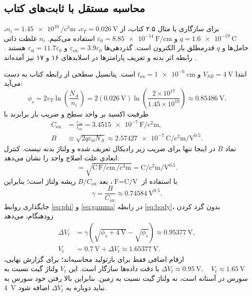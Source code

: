 \documentclass[12pt,a4paper]{article}
\newcommand{\exnum}[1]{\mbox{\beginL#1\endL}}
\begin{document}
\subsection*{محاسبه مستقل با ثابت‌های کتاب}
برای سازگاری با مثال \exnum{۲.۵} کتاب، از \(v_T=\qty{0.026}{\volt}\)، \(n_i=\qty{1.45e10}{\per\cubic\centi\metre}\)، \(q=\qty{1.6e-19}{\coulomb}\) و \(\varepsilon_0=\qty{8.85e-14}{\farad\per\centi\metre}\) استفاده می‌کنیم. \(n_i\) غلظت ذاتی حامل‌ها و \(q\) قدرمطلق بار الکترون است. گذردهی‌ها \(\varepsilon_{\mathrm{ox}}=3.9\varepsilon_0\) و \(\varepsilon_{\mathrm{si}}=11.7\varepsilon_0\) هستند \cite[صفحات چاپی ۶۵ و ۷۹ تا ۸۰]{weste}. رابطه اثر بدنه و تعریف پارامترها در اسلایدهای ۱۶ و ۱۷ نیز آمده‌اند \cite{nonideal}.

ابتدا \(V_{SB}=\qty{4}{\volt}\) و \(t_{\mathrm{ox}}=\qty{1e-6}{\centi\metre}\) است. پتانسیل سطحی از رابطه کتاب به دست می‌آید:
\begin{equation}
 \phi_s=2v_T\ln\!\left(\frac{N_A}{n_i}\right)
 =2(\qty{0.026}{\volt})\ln\!\left(\frac{2\times10^{17}}{1.45\times10^{10}}\right)
 \approx\qty{0.85486}{\volt}.
 \label{eq:phi}
\end{equation}
ظرفیت اکسید بر واحد سطح و ضریب بار برابرند با
\begin{align}
 C_{\mathrm{ox}}&=\frac{\varepsilon_{\mathrm{ox}}}{t_{\mathrm{ox}}}
 =\qty{3.4515e-7}{\farad\per\square\centi\metre},\label{eq:cox}\\
 B&\equiv\sqrt{2q\varepsilon_{\mathrm{si}}N_A}
 \approx\qty{2.57427e-7}{\coulomb\per\square\centi\metre\per\volt\tothe{0.5}}.
 \label{eq:body-coefficient}
\end{align}
نماد \(B\) در اینجا تنها برای ضریب زیر رادیکال تعریف شده و ولتاژ بدنه نیست. کنترل ابعادی علت اصلاح واحد را نشان می‌دهد:
\begin{equation}
 [B]=\sqrt{\unit{\coulomb}\,
                \unit{\farad\per\centi\metre}\,
                \unit{\per\cubic\centi\metre}}
 =\unit{\coulomb\per\square\centi\metre\per\volt\tothe{0.5}}.
 \label{eq:dimension}
\end{equation}
با استفاده از \(\unit{\farad}=\unit{\coulomb\per\volt}\)، بعد \(B/C_{\mathrm{ox}}\) ریشه ولتاژ است؛ بنابراین
\begin{equation}
 \gamma=\frac{B}{C_{\mathrm{ox}}}
 \approx\qty{0.74584}{\volt\tothe{0.5}}.
 \label{eq:gamma}
\end{equation}
جایگذاری روابط \eqref{eq:phi} و \eqref{eq:gamma} در رابطه \eqref{eq:body}، بدون گرد کردن زودهنگام، می‌دهد
\begin{align}
 \Delta V_t&=\gamma\left(\sqrt{\phi_s+\qty{4}{\volt}}-\sqrt{\phi_s}\right)
 \approx\qty{0.95377}{\volt},\label{eq:threshold-shift}\\
 V_t&=\qty{0.7}{\volt}+\Delta V_t\approx\qty{1.65377}{\volt}.
 \label{eq:threshold-new}
\end{align}
ارقام اضافی فقط برای بازتولید محاسبه‌اند؛ برای گزارش نهایی، \(\boxed{\Delta V_t\approx\qty{0.95}{\volt},\quad V_t\approx\qty{1.65}{\volt}}\) با دقت داده‌ها سازگار است. این \(V_t\) ولتاژ گیت نسبت به سورس در آستانه است، نه ولتاژ گیت نسبت به زمین. بنابراین بالا رفتن خود سورس به \qty{4}{\volt} نباید دوباره به \(\Delta V_t\) اضافه شود.
\end{document}
